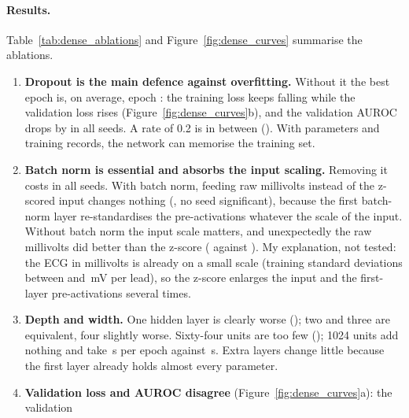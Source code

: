 \paragraph{Results.} Table~\ref{tab:dense_ablations} and Figure~\ref{fig:dense_curves} summarise the
ablations.




\begin{enumerate}[leftmargin=1.4em,itemsep=2pt]
  \item \textbf{Dropout is the main defence against overfitting.} Without it the best epoch is, on
        average, epoch \intval{\denseBestEpochMeanNoDropout}: the training loss keeps falling while the
        validation loss rises (Figure~\ref{fig:dense_curves}b), and the validation AUROC drops by
        \denseDiffMeanNoDropout{} in all seeds. A rate of 0.2 is in between
        (\denseDiffMeanDropoutZeroTwo{}). With \denseParamsBase{} parameters and \edaNLabelledTrain{} training records, the network can
        memorise the training set.
  \item \textbf{Batch norm is essential and absorbs the input scaling.} Removing it costs
        \denseDiffMeanNoBn{} in all seeds. With batch norm, feeding raw millivolts instead of the
        z-scored input changes nothing (\denseDiffMeanNoNorm{}, no seed significant), because the
        first batch-norm layer re-standardises the pre-activations whatever the scale of the input.
        Without batch norm the input scale matters, and unexpectedly the raw millivolts did better
        than the z-score (\denseDiffMeanNoNormNoBn{} against \denseDiffMeanNoBn{}). My explanation, not
        tested: the ECG in millivolts is already on a small scale (training standard deviations between
        \edaLeadStdAVR{} and \edaLeadStdVTwo{}\,mV per lead), so the z-score enlarges the input and
        the first-layer pre-activations several times.
  \item \textbf{Depth and width.} One hidden layer is clearly worse (\denseDiffMeanDepthOne{}); two
        and three are equivalent, four slightly worse. Sixty-four units are too few
        (\denseDiffMeanWidthSixFour{}); 1024 units add nothing and take \denseEpochTimeMeanWidthOneZeroTwoFour{}\,s per epoch against
        \denseEpochTimeMeanBase{}\,s.
        Extra layers change little because the first layer already holds almost every parameter.
  \item \textbf{Validation loss and AUROC disagree} (Figure~\ref{fig:dense_curves}a): the validation

\end{enumerate}
